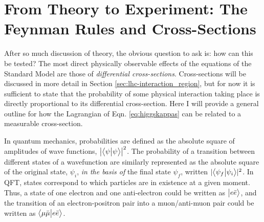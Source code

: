 \section{From Theory to Experiment: The Feynman Rules and Cross-Sections} \label{sec:feyn_rules}
    
    After so much discussion of theory, the obvious question to ask is: how can this be tested?
    The most direct physically observable effects of the equations of the Standard Model are those of \textit{differential cross-sections}.
    Cross-sections will be discussed in more detail in Section \ref{sec:lhc-interaction_region},
        but for now it is sufficient to state that the probability of some physical interaction taking place
        is directly proportional to its differential cross-section.
    Here I will provide a general outline for how the Lagrangian of Eqn. \ref{eq:higgskappas} can be related to a measurable cross-section.

    In quantum mechanics, probabilities are defined as the absolute square of amplitudes of wave functions, $\left|\big< \psi \big| \psi \big>\right|^2$.
    The probability of a transition between different states of a wavefunction are similarly represented
        as the absolute square of the original state, $\psi_i$, \textit{in the basis of} the final state $\psi_f$,
        written $ |\big< \psi_f \big| \psi_i \big>|^2$.
    In QFT, states correspond to which particles are in existence at a given moment.
    Thus, a state of one electron and one anti-electron could be written as $\big| e \bar{e} \big>$,
        and the transition of an electron-positron pair into a muon/anti-muon pair could be written
        as $\big< \mu \bar{\mu} \big| e \bar{e} \big>$.


